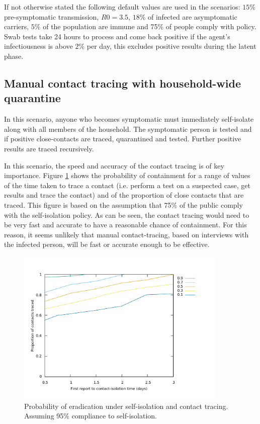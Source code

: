 \documentclass{article}
\begin{document}
If not otherwise stated the following default values are used in the scenarios: $15\%$ pre-symptomatic transmission, $R0 = 3.5$, $18\%$ of infected are asymptomatic carriers, $5\%$ of the population are immune and 75\% of people comply with policy. Swab tests take 24 hours to process and come back positive if the agent's infectiousness is above $2\%$ per day, this excludes positive results during the latent phase.

\subsection{Manual contact tracing with household-wide quarantine}

In this scenario, anyone who becomes symptomatic must immediately self-isolate along with all members of the household. The symptomatic person is tested and if positive close-contacts are traced, quarantined and tested. Further positive results are traced recursively.

In this scenario, the speed and accuracy of the contact tracing is of key importance. Figure \ref{tracingContour} shows the probability of containment for a range of values of the time taken to trace a contact (i.e. perform a test on a suspected case, get results and trace the contact) and of the proportion of close contacts that are traced. This figure is based on the assumption that 75\% of the public comply with the self-isolation policy. As can be seen, the contact tracing would need to be very fast and accurate to have a reasonable chance of containment. For this reason, it seems unlikely that manual contact-tracing, based on interviews with the infected person, will be fast or accurate enough to be effective.

\begin{figure}
\begin{center}
\includegraphics[width = 10cm]{tracingContour.pdf}
\end{center}
\caption{Probability of eradication under self-isolation and contact tracing. Assuming 95\% compliance to self-isolation.}
\label{tracingContour}
\end{figure}
\end{document}
